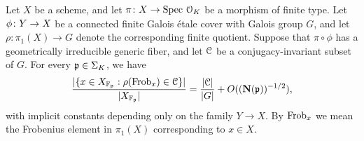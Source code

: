 \begin{theorem} \label{theorem:ekedahl}
	Let $X$ be a scheme, and let $\pi\colon X \rightarrow \text{Spec } \mathcal O_K$ be a morphism of finite type. Let $\phi\colon Y \rightarrow X$ be a connected finite Galois \'{e}tale cover with Galois group $G$, and let $\rho \colon \pi_1(X) \to G$ denote the corresponding finite quotient. Suppose that $\pi \circ \phi$ has a geometrically irreducible generic fiber, and let $\mathcal C$ be a conjugacy-invariant subset of $G$. For every $\mathfrak p \in \Sigma_K$, we have
	\[
		\frac{\lvert \{ x \in X_{\mathbb F_\mathfrak p} :  \rho(\operatorname{Frob}_x) \in \mathcal C\} \rvert }{\lvert X_{\mathbb F_\mathfrak p} \rvert} = \frac{|\mathcal C|}{|G|} + O((\mathbf{N} (\mathfrak{p}))^{-1/2}),
	\]
with implicit constants depending only on the family $Y \rightarrow X$. By $\operatorname{Frob}_x$ we mean the Frobenius element in $\pi_1(X)$ corresponding to $x \in X$.
\end{theorem}

